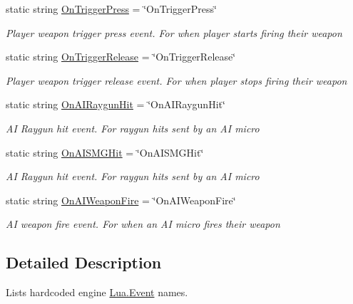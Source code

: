 \begin{DoxyCompactItemize}
static string \mbox{\hyperlink{class_event_code_a42a2b4374afaaf0c95694abdd93e7fe9}{On\+Trigger\+Press}} = \char`\"{}On\+Trigger\+Press\char`\"{}
\begin{DoxyCompactList}\small\item\em Player weapon trigger press event. For when player starts firing their weapon \end{DoxyCompactList}\item 
static string \mbox{\hyperlink{class_event_code_a62441710d089523d4630ac962020a6b5}{On\+Trigger\+Release}} = \char`\"{}On\+Trigger\+Release\char`\"{}
\begin{DoxyCompactList}\small\item\em Player weapon trigger release event. For when player stops firing their weapon \end{DoxyCompactList}\item 
static string \mbox{\hyperlink{class_event_code_a0bb7a7064c6259124a48767341b0211f}{On\+A\+I\+Raygun\+Hit}} = \char`\"{}On\+A\+I\+Raygun\+Hit\char`\"{}
\begin{DoxyCompactList}\small\item\em AI Raygun hit event. For raygun hits sent by an AI micro \end{DoxyCompactList}\item 
static string \mbox{\hyperlink{class_event_code_a379d0656758a2f6d45f7a6b497f2d1e0}{On\+A\+I\+S\+M\+G\+Hit}} = \char`\"{}On\+A\+I\+S\+M\+G\+Hit\char`\"{}
\begin{DoxyCompactList}\small\item\em AI Raygun hit event. For raygun hits sent by an AI micro \end{DoxyCompactList}\item 
static string \mbox{\hyperlink{class_event_code_a6c5540673e62192cd85f1ef886e8076e}{On\+A\+I\+Weapon\+Fire}} = \char`\"{}On\+A\+I\+Weapon\+Fire\char`\"{}
\begin{DoxyCompactList}\small\item\em AI weapon fire event. For when an AI micro fires their weapon \end{DoxyCompactList}\end{DoxyCompactItemize}


\subsection{Detailed Description}
Lists hardcoded engine \mbox{\hyperlink{class_lua_1_1_event}{Lua.\+Event}} names. 



